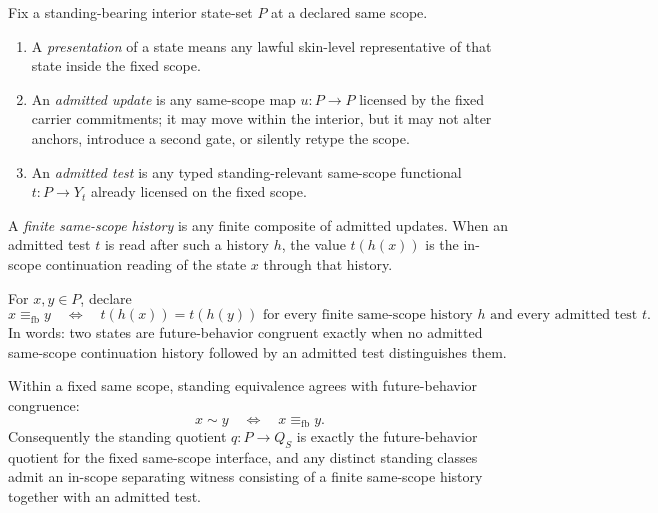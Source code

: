 \begin{definition}\label{def:same-scope-interface}
Fix a standing-bearing interior state-set $P$ at a declared same scope.
\begin{enumerate}[label=(\roman*), leftmargin=2.2em]
\item A \emph{presentation} of a state means any lawful skin-level representative of that state inside the fixed scope.
\item An \emph{admitted update} is any same-scope map $u:P\to P$ licensed by the fixed carrier commitments; it may move within the interior, but it may not alter anchors, introduce a second gate, or silently retype the scope.
\item An \emph{admitted test} is any typed standing-relevant same-scope functional $t:P\to Y_t$ already licensed on the fixed scope.
\end{enumerate}
A \emph{finite same-scope history} is any finite composite of admitted updates. When an admitted test $t$ is read after such a history $h$, the value $t(h(x))$ is the in-scope continuation reading of the state $x$ through that history.
\end{definition}

\begin{definition}\label{def:future-behavior-congruence}
For $x,y\in P$, declare
\[
x\equiv_{\mathrm{fb}} y
\quad\Longleftrightarrow\quad
 t(h(x))=t(h(y))
\text{ for every finite same-scope history $h$ and every admitted test $t$.}
\]
In words: two states are future-behavior congruent exactly when no admitted same-scope continuation history followed by an admitted test distinguishes them.
\end{definition}

\begin{theorem}[Standing quotient = future-behavior quotient]\label{thm:standing-quotient-future-behavior}
Within a fixed same scope, standing equivalence agrees with future-behavior congruence:
\[
x\sim y \quad\Longleftrightarrow\quad x\equiv_{\mathrm{fb}} y.
\]
Consequently the standing quotient $q:P\to Q_S$ is exactly the future-behavior quotient for the fixed same-scope interface, and any distinct standing classes admit an in-scope separating witness consisting of a finite same-scope history together with an admitted test.
\end{theorem}


